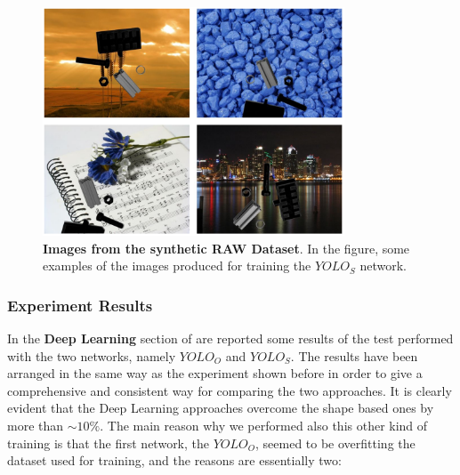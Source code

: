 \begin{figure}
    \centering
    \includegraphics[width=0.8\textwidth]{figures/4_experiments/synthetic_dataset_ex}
    \caption{\textbf{Images from the synthetic RAW Dataset}. In the figure, some examples of the images produced for training the $YOLO_S$ network.}
    \label{fig:synthetic_dataset_ex}
\end{figure}
\subsubsection{Experiment Results}
In the \textbf{Deep Learning} section of  are reported some results of the test performed with the two networks, namely $YOLO_O$ and $YOLO_S$. The results have been arranged in the same way as the experiment shown before in order to give a comprehensive and consistent way for comparing the two approaches. It is clearly evident that the Deep Learning approaches overcome the shape based ones by more than $\sim10\%$. The main reason why we performed also this other kind of training is that the first network, the $YOLO_O$, seemed to be overfitting the dataset used for training, and the reasons are essentially two:

